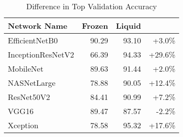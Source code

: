 \begin{table}[htb]
\centering

    \begin{tabular}{ l  r  r  r } \hline
    Network Name       & Frozen & Liquid &          \\ \hline 
    EfficientNetB0     & 90.29  & 93.10  &  +3.0\% \\
    InceptionResNetV2  & 66.39  & 94.33  & +29.6\% \\
    MobileNet          & 89.63  & 91.44  &  +2.0\% \\
    NASNetLarge        & 78.88  & 90.05  & +12.4\% \\
    ResNet50V2         & 84.41  & 90.99  &  +7.2\% \\
    VGG16              & 89.47  & 87.57  &  -2.2\% \\
    Xception           & 78.58  & 95.32  & +17.6\% \\ \hline 
    \end{tabular}

    \caption{Difference in Top Validation Accuracy}
    \label{tbl:training_diff}
\end{table}